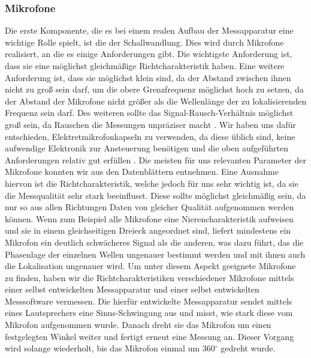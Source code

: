 \subsubsection{Mikrofone}
Die erste Komponente, die es bei einem realen Aufbau der Messapparatur eine wichtige Rolle spielt, ist die der Schallwandlung. Dies wird durch Mikrofone realisiert, an die es einige Anforderungen gibt. Die wichtigste Anforderung ist, dass sie eine möglichst gleichmäßige Richtcharakteristik haben.
Eine weitere Anforderung ist, dass sie möglichst klein sind, da der Abstand zwischen ihnen nicht zu groß sein darf, um die obere Grenzfrequenz möglichst hoch zu setzen, da der Abstand der Mikrofone nicht größer als die Wellenlänge der zu lokalisierenden Frequenz sein darf. Des weiteren sollte das Signal-Rausch-Verhältnis möglichst groß sein, da Rauschen die Messungen unpräziser macht \cite{Rausch}.
Wir haben uns dafür entschieden, Elektretmikrofonkapseln zu verwenden, da diese üblich sind, keine aufwendige Elektronik zur Ansteuerung benötigen und die oben aufgeführten Anforderungen relativ gut erfüllen \cite{elektret}.
Die meisten für uns relevanten Parameter der Mikrofone konnten wir aus den Datenblättern entnehmen. Eine Ausnahme hiervon ist die Richtcharakteristik, welche jedoch für uns sehr wichtig ist, da sie die Messqualität sehr stark beeinflusst. Diese sollte möglichst gleichmäßig sein, da nur so aus allen Richtungen Daten von gleicher Qualität aufgenommen werden können. Wenn zum Beispiel alle Mikrofone eine Nierencharakteristik aufweisen und sie in einem gleichseitigen Dreieck angeordnet sind, liefert mindestens ein Mikrofon ein deutlich schwächeres Signal als die anderen, was dazu führt, das die Phasenlage der einzelnen Wellen ungenauer bestimmt werden und mit ihnen auch die Lokalisation ungenauer wird.
Um unter diesem Aspekt geeignete Mikrofone zu finden, haben wir die Richtcharakteristiken verschiedener Mikrofone mittels einer selbst entwickelten Messapparatur und einer selbst entwickelten Messsoftware vermessen. Die hierfür entwickelte Messapparatur sendet mittels eines Lautsprechers eine Sinus-Schwingung aus und misst, wie stark diese vom Mikrofon aufgenommen wurde. Danach dreht sie das Mikrofon um einen festgelegten Winkel weiter und fertigt erneut eine Messung an. Dieser Vorgang wird solange wiederholt, bis das Mikrofon einmal um 360$^{\circ}$ gedreht wurde.

